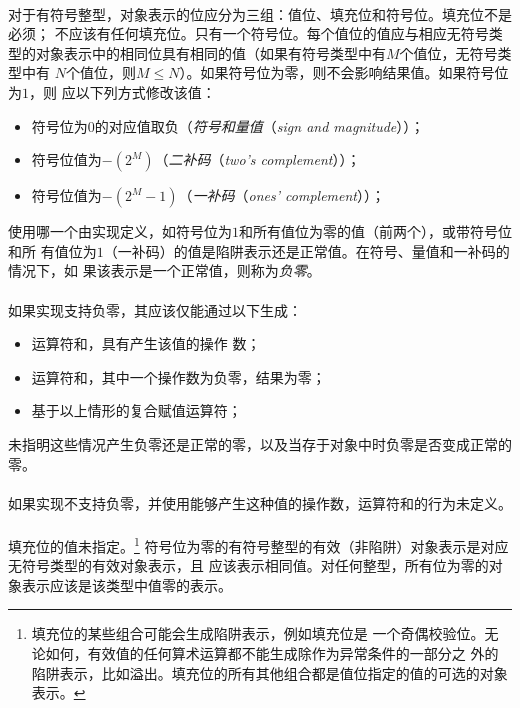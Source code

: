 {\paragraph{}
对于有符号整型，对象表示的位应分为三组：值位、填充位和符号位。填充位不是必须；
不应该有任何填充位。只有一个符号位。每个值位的值应与相应无符号类
型的对象表示中的相同位具有相同的值（如果有符号类型中有$M$个值位，无符号类型中有
$N$个值位，则$M \le N$）。如果符号位为零，则不会影响结果值。如果符号位为$1$，则
应以下列方式修改该值：
\begin{itemize}
  \item{符号位为$0$的对应值取负（\textit{符号和量值}（\textit{sign and
    magnitude}））；}
  \item{符号位值为$-(2^M)$（\textit{二补码}（\textit{two's complement}））；}
  \item{符号位值为$-(2^M-1)$（\textit{一补码}（\textit{ones' complement}））；}
\end{itemize}
使用哪一个由实现定义，如符号位为$1$和所有值位为零的值（前两个），或带符号位和所
有值位为$1$（一补码）的值是陷阱表示还是正常值。在符号、量值和一补码的情况下，如
果该表示是一个正常值，则称为\textit{负零}。

\paragraph{}
如果实现支持负零，其应该仅能通过以下生成：
\begin{itemize}
  \item{运算符和\tm{\tg{}\tg{}}，具有产生该值的操作
    数；}
  \item{运算符和\tm{\%}，其中一个操作数为负零，结果为零；}
  \item{基于以上情形的复合赋值运算符；}
\end{itemize}
未指明这些情况产生负零还是正常的零，以及当存于对象中时负零是否变成正常的零。

\paragraph{}
如果实现不支持负零，并使用能够产生这种值的操作数，运算符和\tm{\tg{}\tg{}}的行为未定义。

\paragraph{}
填充位的值未指定。\footnote{填充位的某些组合可能会生成陷阱表示，例如填充位是
一个奇偶校验位。无论如何，有效值的任何算术运算都不能生成除作为异常条件的一部分之
外的陷阱表示，比如溢出。填充位的所有其他组合都是值位指定的值的可选的对象表示。}
符号位为零的有符号整型的有效（非陷阱）对象表示是对应无符号类型的有效对象表示，且
应该表示相同值。对任何整型，所有位为零的对象表示应该是该类型中值零的表示。

}
